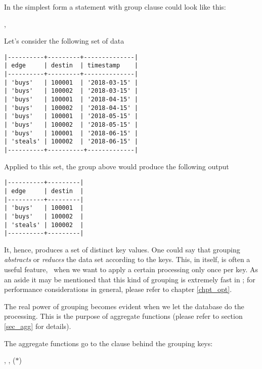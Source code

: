 In the simplest form a statement with
group clause could look like this:

 ,
 
 

Let's consider the following set of data

\begin{minipage}{\textwidth}
\begin{verbatim}
|----------+---------+--------------|
| edge     | destin  | timestamp    |
|----------+---------+--------------|
| 'buys'   | 100001  | '2018-03-15' |
| 'buys'   | 100002  | '2018-03-15' |
| 'buys'   | 100001  | '2018-04-15' |
| 'buys'   | 100002  | '2018-04-15' |
| 'buys'   | 100001  | '2018-05-15' |
| 'buys'   | 100002  | '2018-05-15' |
| 'buys'   | 100001  | '2018-06-15' |
| 'steals' | 100002  | '2018-06-15' |
|----------+----------+-------------|
\end{verbatim}
\end{minipage}

Applied to this set,
the group above would produce the following output

\begin{minipage}{\textwidth}
\begin{verbatim}
|----------+---------|
| edge     | destin  |
|----------+---------|
| 'buys'   | 100001  |
| 'buys'   | 100002  |
| 'steals' | 100002  |
|----------+---------|
\end{verbatim}
\end{minipage}

It, hence, produces a set of distinct key values.
One could say that grouping \emph{abstracts} or \emph{reduces}
the data set according to the keys.
This, in itself, is often a useful feature,
\viz\ when we want to apply a certain processing
only once per key. As an aside it may be mentioned
that this kind of grouping is extremely fast in \nowdb;
for performance considerations in general, please
refer to chapter \ref{chpt_opt}.

The real power of grouping becomes evident
when we let the database do the processing.
This is the purpose of aggregate functions
(please refer to section \ref{sec_agg} for details).

The aggregate functions go to the  clause
behind the grouping keys:

 ,
                 ,
                 ($\ast$)
 
 

